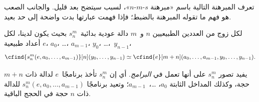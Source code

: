 \documentclass[../../../include/open-logic-section]{subfiles}
\begin{document}

\begin{explain}
تعرف المبرهنة التالية باسم «مبرهنة $s$-$m$-$n$»، لسبب سيتضح بعد
قليل. والجانب الصعب هو فهم ما تقوله المبرهنة بالضبط؛ فإذا فهمت عبارتها
بدت واضحة إلى حد بعيد.
\end{explain}

\begin{thm}
  لكل زوج من العددين الطبيعيين $n$ و~$m$ دالة عودية بدائية~$s^m_n$
  بحيث يكون لدينا، لكل أعداد طبيعية $e$، $a_0$، …، $a_{m-1}$، $y_0$،
  …،~$y_{n-1}$،
  \[
  \cfind{s^m_n(e, a_0, \dots, a_{m-1})}[n](y_0, \dots, y_{n-1}) \simeq
  \cfind{e}[m+n](a_0, \dots, a_{m-1}, y_0, \dots, y_{n-1}).
\]
\end{thm}


\begin{explain}
يفيد تصور $s^m_n$ على أنها تعمل في \emph{البرامج}. أي إن $s^m_n$
تأخذ برنامجًا~$e$ لدالة ذات $m+n$ حجة، وكذلك المداخل الثابتة $a_0$،
…،~$a_{m-1}$؛ وتعيد برنامجًا
$s^m_n(e,a_0,\dots,a_{m-1})$ للدالة ذات $n$ حجة في الحجج الباقية.
\end{explain}
\end{document}
